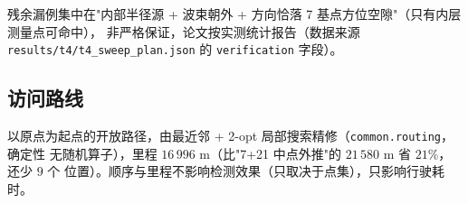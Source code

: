 残余漏例集中在"内部半径源 + 波束朝外 + 方向恰落 7 基点方位空隙"（只有内层测量点可命中），
非严格保证，论文按实测统计报告（数据来源 \texttt{results/t4/t4\_sweep\_plan.json} 的
\texttt{verification} 字段）。

\subsection{访问路线}

以原点为起点的开放路径，由最近邻 + 2-opt 局部搜索精修（\texttt{common.routing}，确定性
无随机算子），里程 $16\,996$ m（比"7+21 中点外推"的 $21\,580$ m 省 $21\%$，还少 $9$ 个
位置）。顺序与里程不影响检测效果（只取决于点集），只影响行驶耗时。